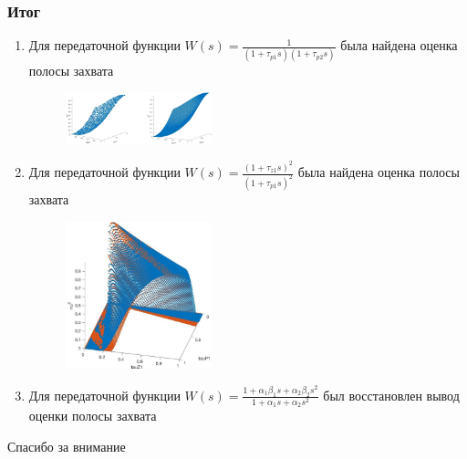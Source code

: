 \documentclass{beamer}
\begin{document}
\begin{frame}
\frametitle{Итог}
\begin{enumerate}
\item Для передаточной функции $W(s) = \frac{1}{(1+\tau_{p1}s)(1+\tau_{p2}s)}$
была найдена оценка полосы захвата
\begin{figure}[H] 
  \includegraphics[width=0.4\textwidth]{images/agregated.eps}
\end{figure}
\item Для передаточной функции $W(s) = \frac{(1+\tau_{z1}s)^2}{(1+\tau_{p1}s)^2}$
была найдена оценка полосы захвата
\begin{figure}[H] 
  \includegraphics[width=0.4\textwidth]{images/main.eps}
\end{figure}
\item Для передаточной функции $W(s) = \frac{1+\alpha_1\beta_1s + \alpha_2\beta_2s^2}{1+\alpha_1s + \alpha_2s^2}$ был восстановлен вывод оценки полосы захвата
\end{enumerate}
\end{frame}


\begin{frame}
\Huge{\centerline{Спасибо за внимание}}
\end{frame}

\end{document}
